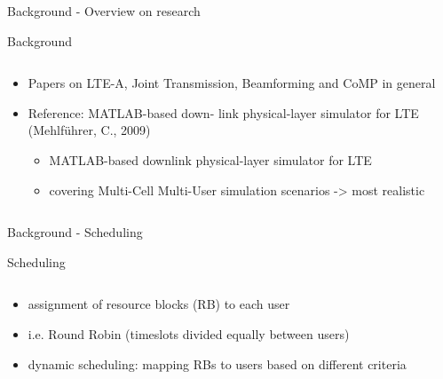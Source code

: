 \documentclass[xcolor={cmyk}]{beamer}
\begin{document}
 \begin{frame}{Background - Overview on research}
	 \begin{block}{Background}
	 	\begin{columns}
			\begin{column}{.9\textwidth}
				\begin{itemize}
					\item Papers on LTE-A, Joint Transmission, Beamforming and CoMP in general
					\item Reference: MATLAB-based down-
link physical-layer simulator for LTE (Mehlführer, C., 2009)
					\begin{itemize}
						\item MATLAB-based downlink physical-layer simulator for LTE
						\item covering Multi-Cell Multi-User simulation scenarios -> most realistic
					\end{itemize}
				\end{itemize}
			\end{column}
		\end{columns}
	 \end{block}
 \end{frame}
 
 
 \begin{frame}{Background - Scheduling}
 	\begin{block}{Scheduling}
		\begin{columns}
			\begin{column}{.9\textwidth}
				\begin{itemize}
					\item assignment of resource blocks (RB) to each user
					\item i.e. Round Robin (timeslots divided equally between users)
					\item dynamic scheduling: mapping RBs to users based on different criteria
				\end{itemize}
			\end{column}
		\end{columns}
	 \end{block}
 \end{frame}
\end{document}
